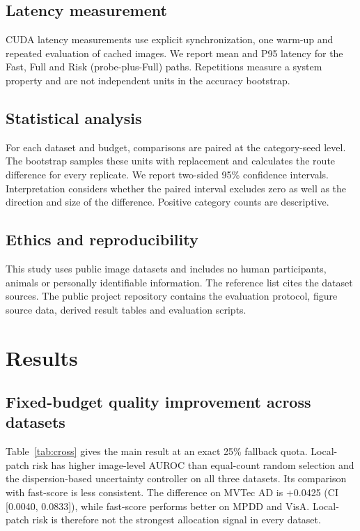 \documentclass[iicol,pdflatex,sn-basic,Numbered]{sn-jnl}
\begin{document}
\subsection{Latency measurement}
CUDA latency measurements use explicit synchronization, one warm-up and repeated evaluation of cached images. We report mean and P95 latency for the Fast, Full and Risk (probe-plus-Full) paths. Repetitions measure a system property and are not independent units in the accuracy bootstrap.

\subsection{Statistical analysis}
For each dataset and budget, comparisons are paired at the category-seed level. The bootstrap samples these units with replacement and calculates the route difference for every replicate. We report two-sided 95\% confidence intervals. Interpretation considers whether the paired interval excludes zero as well as the direction and size of the difference. Positive category counts are descriptive.

\subsection{Ethics and reproducibility}
This study uses public image datasets and includes no human participants, animals or personally identifiable information. The reference list cites the dataset sources. The public project repository contains the evaluation protocol, figure source data, derived result tables and evaluation scripts.

\section{Results}\label{sec:results}

\subsection{Fixed-budget quality improvement across datasets}
Table~\ref{tab:cross} gives the main result at an exact 25\% fallback quota. Local-patch risk has higher image-level AUROC than equal-count random selection and the dispersion-based uncertainty controller on all three datasets. Its comparison with fast-score is less consistent. The difference on MVTec AD is +0.0425 (CI [0.0040, 0.0833]), while fast-score performs better on MPDD and VisA. Local-patch risk is therefore not the strongest allocation signal in every dataset.
\end{document}
